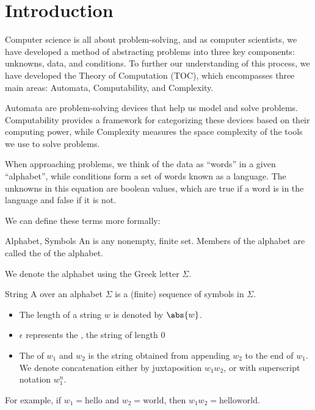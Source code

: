 \chapter{Introduction}
Computer science is all about problem-solving, and as computer scientists, we have developed a method of abstracting problems into three key components: unknowns, data, and conditions. To further our understanding of this process, we have developed the Theory of Computation (TOC), which encompasses three main areas: Automata, Computability, and Complexity.

Automata are problem-solving devices that help us model and solve problems. Computability provides a framework for categorizing these devices based on their computing power, while Complexity measures the space complexity of the tools we use to solve problems.

When approaching problems, we think of the data as ``words'' in a given ``alphabet'', while conditions form a set of words known as a language. The unknowns in this equation are boolean values, which are true if a word is in the language and false if it is not.

We can define these terms more formally:

\begin{dfnbox}{Alphabet, Symbols}{}
    An  is any nonempty, finite set. Members of the alphabet are called the  of the alphabet.
\end{dfnbox}

We denote the alphabet using the Greek letter $\Sigma$.

\begin{dfnbox}{String}{}
    A  over an alphabet $\Sigma$ is a (finite) sequence of symbols in $\Sigma$.
    \begin{itemize}[noitemsep]
        \item The length of a string $w$ is denoted by $\abs{w}$.
        \item $\epsilon$ represents the , the string of length $0$
        \item The  of $w_1$ and $w_2$ is the string obtained from appending $w_2$ to the end of $w_1$. We denote concatenation either by juxtaposition $w_1w_2$, or with superscript notation $w_1^n$.
    \end{itemize}
\end{dfnbox}

For example, if $w_1 = \text{hello}$ and $w_2 = \text{world}$, then $w_1w_2 = \text{helloworld}$.

